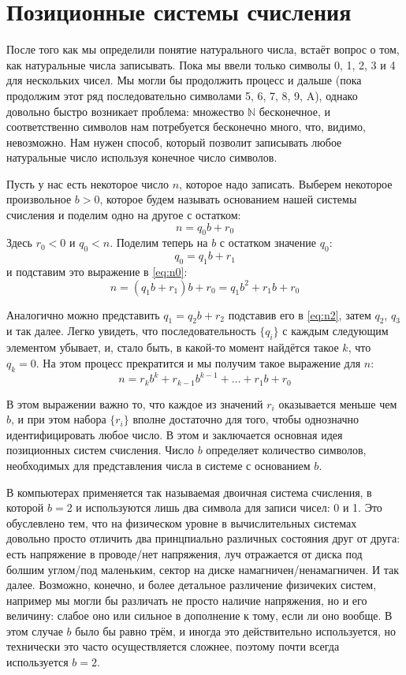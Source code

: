 \section{Позиционные системы счисления}

После того как мы определили понятие натурального числа, встаёт вопрос о том, как натуральные числа записывать. Пока мы ввели только символы 0, 1, 2, 3 и 4 для нескольких чисел. Мы могли бы продолжить процесс и дальше (пока продолжим этот ряд последовательно символами 5, 6, 7, 8, 9, A), однако довольно быстро возникает проблема: множество $\mathbb{N}$ бесконечное, и соответственно символов нам потребуется бесконечно много, что, видимо, невозможно. Нам нужен способ, который позволит записывать любое натуральные число используя конечное число символов.

Пусть у нас есть некоторое число $n$, которое надо записать. Выберем некоторое произвольное $b > 0$, которое будем называть основанием нашей системы счисления и поделим одно на другое с остатком:
\begin{equation}\label{eq:n0}
n = q_0b + r_0
\end{equation}
Здесь $r_0 < 0$ и $q_0 < n$. Поделим теперь на $b$ с остатком значение $q_0$: $$q_0 = q_1b + r_1$$ и подставим это выражение в \eqref{eq:n0}:
\begin{equation}\label{eq:n1}
n = (q_1b + r_1)b + r_0 = q_1b^2 + r_1b + r_0
\end{equation}

Аналогично можно представить $q_1 = q_2b + r_2$ подставив его в \eqref{eq:n2}, затем $q_2$, $q_3$ и так далее. Легко увидеть, что последовательность $\{q_i\}$ с каждым следующим элементом убывает, и, стало быть, в какой-то момент найдётся такое $k$, что $q_k = 0$. На этом процесс прекратится и мы получим такое выражение для $n$:
\begin{equation}\label{eq:nk}
n = r_kb^k + r_{k-1}b^{k-1} +\ldots + r_1b + r_0
\end{equation}

В этом выражении важно то, что каждое из значений $r_i$ оказывается меньше чем $b$, и при этом набора $\{r_i\}$ вполне достаточно для того, чтобы однозначно идентифицировать любое число. В этом и заключается основная идея позиционных систем счисления. Число $b$ определяет количество символов, необходимых для представления числа в системе с основанием $b$.

В компьютерах применяется так называемая двоичная система счисления, в которой $b=2$ и используются лишь два символа для записи чисел: 0 и 1. Это обуслевлено тем, что на физическом уровне в вычислительных системах довольно просто отличить два принцпиально различных состояния друг от друга: есть напряжение в проводе/нет напряжения, луч отражается от диска под болшим углом/под маленьким, сектор на диске намагничен/ненамагничен. И так далее. Возможно, конечно, и более детальное различение физичеких систем, например мы могли бы различать не просто наличие напряжения, но и его величину: слабое оно или сильное в дополнение к тому, если ли оно вообще. В этом случае $b$ было бы равно трём, и иногда это действительно используется, но технически это часто осуществляется сложнее, поэтому почти всегда используется $b=2$.

